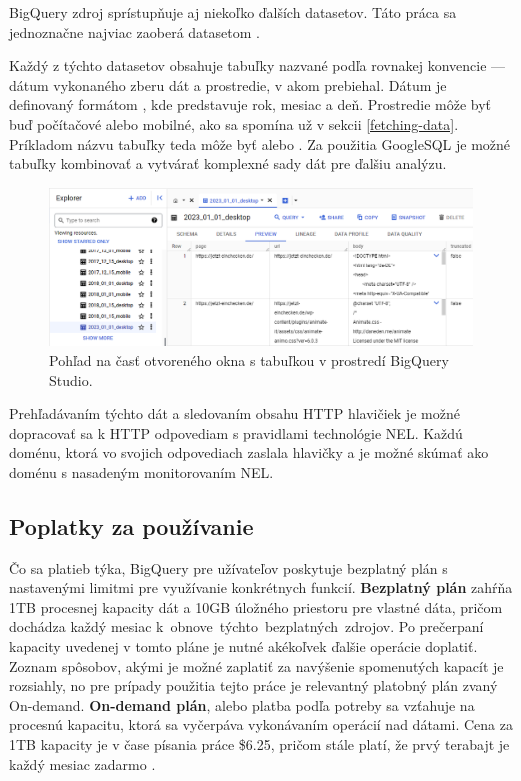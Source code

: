 BigQuery zdroj  sprístupňuje aj niekoľko ďalších datasetov. Táto práca sa jednoznačne najviac zaoberá datasetom .

Každý z týchto datasetov obsahuje tabuľky nazvané podľa rovnakej konvencie --- dátum vykonaného zberu dát a prostredie, v akom prebiehal.
Dátum je definovaný formátom , kde  predstavuje rok,  mesiac a  deň. 
Prostredie môže byť buď počítačové alebo mobilné, ako sa spomína už v sekcii \ref{fetching-data}.
Príkladom názvu tabuľky teda môže byť  alebo .
Za použitia GoogleSQL je možné tabuľky kombinovať a vytvárať komplexné sady dát pre ďalšiu analýzu.

\begin{figure}[htb]
\begin{center}
 \includegraphics[scale=0.53]{obrazky-figures/bigquery_response_bodies.png}    
 \caption{Pohľad na časť otvoreného okna s tabuľkou  v prostredí BigQuery Studio.}
 \label{img:bigquery-example-table}
\end{center}
\end{figure}

Prehľadávaním týchto dát a sledovaním obsahu HTTP hlavičiek je možné dopracovať sa k HTTP odpovediam s pravidlami technológie NEL.
Každú doménu, ktorá vo svojich odpovediach zaslala hlavičky  a  je možné skúmať ako doménu s nasadeným monitorovaním NEL.

\pagebreak

\subsection{Poplatky za používanie}
\label{httparchive-costs}

Čo sa platieb týka, BigQuery pre užívateľov poskytuje bezplatný plán s nastavenými limitmi pre využívanie konkrétnych funkcií.
\textbf{Bezplatný plán} zahŕňa 1TB procesnej kapacity dát a 10GB úložného priestoru pre vlastné dáta, pričom dochádza každý mesiac \mbox{k obnove týchto bezplatných zdrojov}.
Po prečerpaní kapacity uvedenej v tomto pláne je nutné akékoľvek ďalšie operácie doplatiť.
Zoznam spôsobov, akými je možné zaplatiť za navýšenie spomenutých kapacít je rozsiahly, no pre prípady použitia tejto práce je relevantný platobný plán zvaný On-demand.
\textbf{On-demand plán}, alebo platba podľa potreby sa vzťahuje na procesnú kapacitu, ktorá sa vyčerpáva vykonávaním operácií nad dátami.
Cena za 1TB kapacity je v čase písania práce \$6.25, pričom stále platí, že prvý terabajt je každý mesiac zadarmo \cite{google-bq-pricing}.

